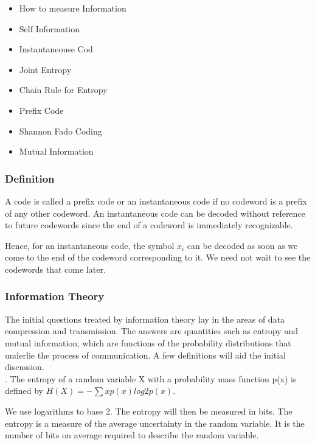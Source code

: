 
\begin{frame}
\begin{itemize}
	\item How to measure Information
	\item Self Information
	\item Instantaneouse Cod
	\item Joint Entropy
	\item Chain Rule for Entropy
	\item Prefix Code
	\item Shannon Fado Coding
	\item Mutual Information
\end{itemize}
\end{frame}


\begin{frame}

\frametitle{Definition} A code is called a prefix code or an instantaneous code if
no codeword is a prefix of any other codeword.
An instantaneous code can be decoded without reference to future codewords
since the end of a codeword is immediately recognizable. 

Hence,
for an instantaneous code, the symbol $x_i$ can be decoded as soon as we
come to the end of the codeword corresponding to it. We need not wait
to see the codewords that come later. 
\end{frame}


\begin{frame}
\frametitle{Information Theory}
The initial questions treated by information theory lay in the
areas of data compression and transmission. The answers are
quantities such as entropy and mutual information, which are
functions of the probability distributions that underlie the
process of communication. A few definitions will aid the initial
discussion. \\. The entropy
of a random variable X with a probability mass function p(x) is
defined by $H(X) = -\sum x p(x) log2 p(x)$. 
\end{frame}
\begin{frame}
We use logarithms to base 2. The entropy will then be measured in
bits. The entropy is a measure of the average uncertainty in the
random variable. It is the number of bits on average required to
describe the random variable.
\end{frame}



